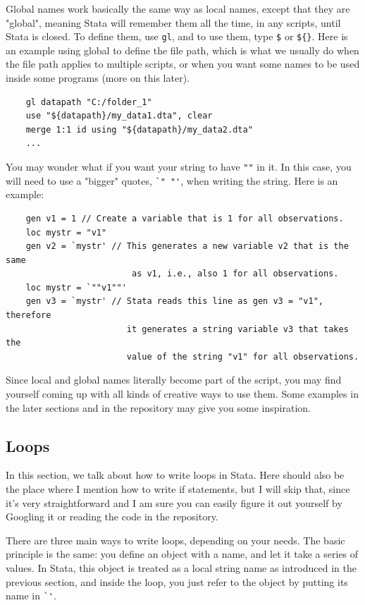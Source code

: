 Global names work basically the same way as local names, except that they are "global", meaning Stata will remember them all the time, in any scripts, until Stata is closed. To define them, use \verb|gl|, and to use them, type \verb|$| or \verb|${}|. Here is an example using global to define the file path, which is what we usually do when the file path applies to multiple scripts, or when you want some names to be used inside some programs (more on this later). 
\begin{verbatim}
    gl datapath "C:/folder_1"
    use "${datapath}/my_data1.dta", clear 
    merge 1:1 id using "${datapath}/my_data2.dta"
    ... 
\end{verbatim}

You may wonder what if you want your string to have \verb|""| in it. In this case, you will need to use a "bigger" quotes, \verb|`" "'|, when writing the string. Here is an example:
\begin{verbatim}
    gen v1 = 1 // Create a variable that is 1 for all observations.
    loc mystr = "v1"
    gen v2 = `mystr' // This generates a new variable v2 that is the same
                         as v1, i.e., also 1 for all observations.
    loc mystr = `""v1""'
    gen v3 = `mystr' // Stata reads this line as gen v3 = "v1", therefore
                        it generates a string variable v3 that takes the 
                        value of the string "v1" for all observations. 
\end{verbatim}
Since local and global names literally become part of the script, you may find yourself coming up with all kinds of creative ways to use them. Some examples in the later sections and in the repository may give you some inspiration. 

\subsection{Loops}
In this section, we talk about how to write loops in Stata. Here should also be the place where I mention how to write if statements, but I will skip that, since it's very straightforward and I am sure you can easily figure it out yourself by Googling it or reading the code in the repository. 

There are three main ways to write loops, depending on your needs. The basic principle is the same: you define an object with a name, and let it take a series of values. In Stata, this object is treated as a local string name as introduced in the previous section, and inside the loop, you just refer to the object by putting its name in \verb|`'|.

